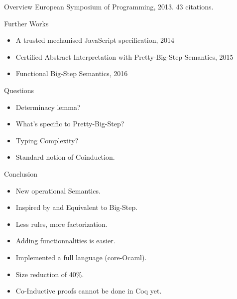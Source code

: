 \documentclass[page number,dvipsnames]{beamer}
\begin{document}
\begin{frame}{Overview}
  European Symposium of Programming, 2013. 43 citations.
  \vfill
  \begin{exampleblock}{Further Works}
    \begin{itemize}
    \item A trusted mechanised JavaScript specification, 2014
    \item Certified Abstract Interpretation with Pretty-Big-Step Semantics, 2015
    \item Functional Big-Step Semantics, 2016
    \end{itemize}
  \end{exampleblock}
  \vfill
  \begin{alertblock}{Questions}
    \begin{itemize}
    \item Determinacy lemma?
    \item What's specific to Pretty-Big-Step?
    \item Typing Complexity?
    \item Standard notion of Coinduction.
    \end{itemize}
  \end{alertblock}

\end{frame}

\begin{frame}{Conclusion}
  \begin{itemize}
  \item New operational Semantics.
  \item Inspired by and Equivalent to Big-Step.
  \item Less rules, more factorization.
  \item Adding functionnalities is easier.
  \item Implemented a full language (core-Ocaml).
  \item Size reduction of 40\%.
  \item Co-Inductive proofs cannot be done in Coq yet.
  \end{itemize}
\end{frame}
\end{document}
